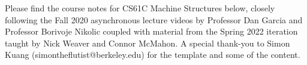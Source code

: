 \documentclass[10pt, article, oneside, margin=1in]{memoir}
\begin{document}
	\maketitle
	
	Please find the course notes for CS61C Machine Structures below, closely following the Fall 2020 asynchronous lecture videos by Professor Dan Garcia and Professor Borivoje Nikolic coupled with material from the Spring 2022 iteration taught by Nick Weaver and Connor McMahon. A special thank-you to Simon Kuang (simontheflutist@berkeley.edu) for the template and some of the content.
	
	\tableofcontents*
	\newpage

	
	
	
	
	
	
	
	
	
	
	
	
	
	
	
	
	
	
	
	
	
	
	
	
	
	
\end{document}
